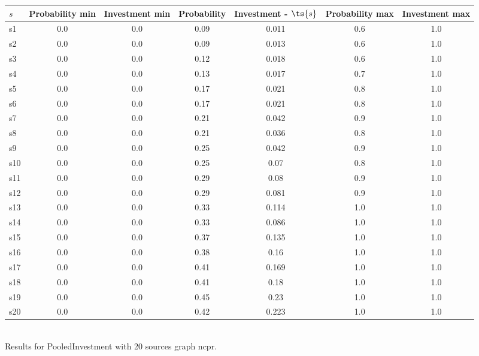 \documentclass{article}
\begin{document}
\noindent\begin{tabular}{|l|c|c|c|c|c|c|}
\hline
$s$& Probability min & Investment min & Probability & Investment - $\ts{s}$ & Probability max & Investment max\\
\hline
s1 &0.0 & 0.0 & 0.09 & 0.011 & 0.6 & 1.0\\
\hline
s2 &0.0 & 0.0 & 0.09 & 0.013 & 0.6 & 1.0\\
\hline
s3 &0.0 & 0.0 & 0.12 & 0.018 & 0.6 & 1.0\\
\hline
s4 &0.0 & 0.0 & 0.13 & 0.017 & 0.7 & 1.0\\
\hline
s5 &0.0 & 0.0 & 0.17 & 0.021 & 0.8 & 1.0\\
\hline
s6 &0.0 & 0.0 & 0.17 & 0.021 & 0.8 & 1.0\\
\hline
s7 &0.0 & 0.0 & 0.21 & 0.042 & 0.9 & 1.0\\
\hline
s8 &0.0 & 0.0 & 0.21 & 0.036 & 0.8 & 1.0\\
\hline
s9 &0.0 & 0.0 & 0.25 & 0.042 & 0.9 & 1.0\\
\hline
s10 &0.0 & 0.0 & 0.25 & 0.07 & 0.8 & 1.0\\
\hline
s11 &0.0 & 0.0 & 0.29 & 0.08 & 0.9 & 1.0\\
\hline
s12 &0.0 & 0.0 & 0.29 & 0.081 & 0.9 & 1.0\\
\hline
s13 &0.0 & 0.0 & 0.33 & 0.114 & 1.0 & 1.0\\
\hline
s14 &0.0 & 0.0 & 0.33 & 0.086 & 1.0 & 1.0\\
\hline
s15 &0.0 & 0.0 & 0.37 & 0.135 & 1.0 & 1.0\\
\hline
s16 &0.0 & 0.0 & 0.38 & 0.16 & 1.0 & 1.0\\
\hline
s17 &0.0 & 0.0 & 0.41 & 0.169 & 1.0 & 1.0\\
\hline
s18 &0.0 & 0.0 & 0.41 & 0.18 & 1.0 & 1.0\\
\hline
s19 &0.0 & 0.0 & 0.45 & 0.23 & 1.0 & 1.0\\
\hline
s20 &0.0 & 0.0 & 0.42 & 0.223 & 1.0 & 1.0\\
\hline
\end{tabular}\\

\noindent Results for PooledInvestment with 20 sources graph ncpr.
\end{document}

